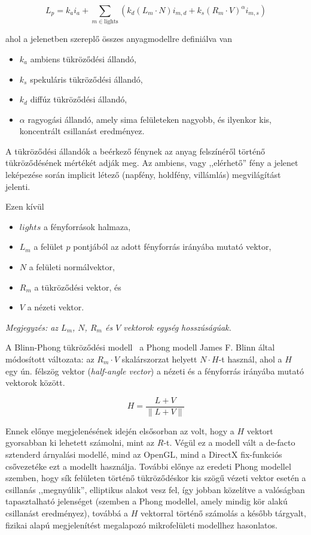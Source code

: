\[
L_{p} = k_a i_a + \sum_{m \in \textrm{lights}} {\left( k_d (L_m \cdot N) i_{m,d} + k_s(R_m \cdot V)^\alpha i_{m,s} \right)}
\]

ahol a jelenetben szereplő összes anyagmodellre definiálva van

\begin{itemize}[noitemsep]
\item \(k_a\) ambiens tükröződési állandó,
\item \(k_s\) spekuláris tükröződési állandó,
\item \(k_d\) diffúz tükröződési állandó,
\item \(\alpha\) ragyogási állandó, amely sima felületeken nagyobb, és ilyenkor kis, koncentrált csillanást eredményez.
\end{itemize}

A tükröződési állandók a beérkező fénynek az anyag felszínéről történő tükröződésének mértékét adják meg. Az ambiens, vagy ,,elérhető'' fény a jelenet leképezése során implicit létező (napfény, holdfény, villámlás) megvilágítást jelenti.

Ezen kívül

\begin{itemize}[noitemsep]
\item \(lights\) a fényforrások halmaza,
\item \(L_m\) a felület \(p\) pontjából az adott fényforrás irányába mutató vektor,
\item \(N\) a felületi normálvektor,
\item \(R_m\) a tükröződési vektor, és
\item \(V\) a nézeti vektor.
\end{itemize}

\textit{Megjegyzés: az \(L_m\), \(N\), \(R_m\) és \(V\) vektorok egység hosszúságúak.}

A Blinn-Phong tükröződési modell~\cite{blinn1977models} a Phong modell James F. Blinn által módosított változata: az \(R_m \cdot V\) skalárszorzat helyett \(N \cdot H\)-t használ, ahol a \(H\) egy ún. félszög vektor (\textit{half-angle vector}) a nézeti és a fényforrás irányába mutató vektorok között.

\[
H = \frac{ L + V }{ \| L + V \| }
\]

Ennek előnye megjelenésének idején elsősorban az volt, hogy a \(H\) vektort gyorsabban ki lehetett számolni, mint az \(R\)-t. Végül ez a modell vált a de-facto sztenderd árnyalási modellé, mind az OpenGL, mind a DirectX fix-funkciós csővezetéke ezt a modellt használja. További előnye az eredeti Phong modellel szemben, hogy sík felületen történő tükröződéskor kis szögű vézeti vektor esetén a csillanás ,,megnyúlik'', elliptikus alakot vesz fel, így jobban közelítve a valóságban tapasztalható jelenséget (szemben a Phong modellel, amely mindig kör alakú csillanást eredményez), továbbá a \(H\) vektorral történő számolás a később tárgyalt, fizikai alapú megjelenítést megalapozó mikrofelületi modellhez hasonlatos.

